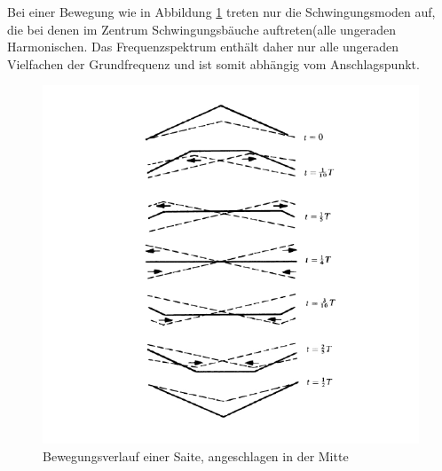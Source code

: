 \documentclass[a4paper, 11pt]{article}
\begin{document}
Bei einer Bewegung wie in Abbildung \ref{fig:Bewegungsverlauf einer Saite, angeschlagen in der Mitte} treten nur die Schwingungsmoden auf, die bei denen im Zentrum Schwingungsbäuche auftreten(alle ungeraden Harmonischen. Das Frequenzspektrum enthält daher nur alle ungeraden Vielfachen der Grundfrequenz und ist somit abhängig vom Anschlagspunkt.
\begin{figure}[H]
	\centering
	\includegraphics[scale=0.4]{../Bewegungsverlauf.jpg}
	\caption{Bewegungsverlauf einer Saite, angeschlagen in der Mitte}
	\label{fig:Bewegungsverlauf einer Saite, angeschlagen in der Mitte}
\end{figure}
\end{document}
